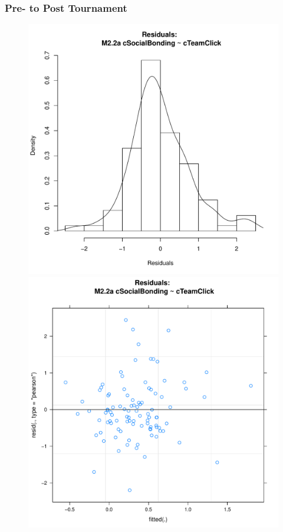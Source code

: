 \begin{CJK}{UTF8}{gbsn}
      \subsubsection{Pre- to Post Tournament\label{app8:prediction1bPrePost}}


      

      \begin{figure}[htbp]
        \includegraphics[scale =.4]{images/MLM22aHist.pdf}
        \includegraphics[scale =.4]{images/MLM22aScatter.pdf}

\end{figure}
\end{CJK}

